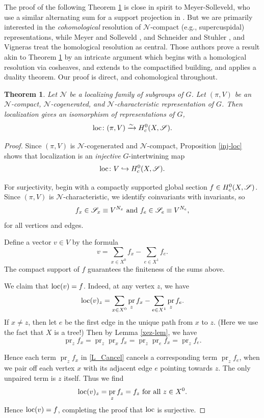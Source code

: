 \documentclass[letter]{amsart}
\newtheorem{thm}{Theorem}[section]
\theoremstyle{definition}
\theoremstyle{remark}
\numberwithin{thm}{section}
\numberwithin{equation}{section}
\renewcommand{\NN}{{\mathcal N}}
\DeclareMathOperator{\pr}{pr}
\begin{document}
The proof of the following Theorem \ref{localization} is close in spirit to Meyer-Solleveld, who use a similar alternating sum for a support projection in \cite[Theorem 2.12]{MS}.  But we are primarily interested in the {\em cohomological} resolution of $\NN$-compact (e.g., supercuspidal) representations, while Meyer and Solleveld \cite{MS}, and Schneider and Stuhler \cite{SS}, and Vigneras \cite{Vigneras} treat the homological resolution as central.  Those authors prove a result akin to Theorem \ref{localization} by an intricate argument which begins with a homological resolution via cosheaves, and extends to the compactified building, and applies a duality theorem.  Our proof is direct, and cohomological throughout.
\begin{thm}
\label{localization}
Let $\NN$ be a localizing family of subgroups of $G$.  Let $(\pi, V)$ be an $\NN$-compact, $\NN$-cogenerated, and $\NN$-characteristic representation of $G$.  Then localization gives an isomorphism of representations of $G$,
$$\operatorname{loc} \colon (\pi, V) \xrightarrow{\sim} H_c^0(X, {\mathscr{S}}).$$
\end{thm}
\begin{proof}
Since $(\pi, V)$ is $\NN$-cogenerated and $\NN$-compact, Proposition \ref{inj-loc} shows that localization is an {\em injective} $G$-intertwining map
$$\operatorname{loc} \colon V \hookrightarrow H_c^0(X, {\mathscr{S}}).$$

For surjectivity, begin with a compactly supported global section $f \in H_c^0(X, {\mathscr{S}})$.  Since $(\pi, V)$ is $\NN$-characteristic, we identify coinvariants with invariants, so 
$$f_x \in {\mathscr{S}}_x \equiv V^{N_x} \text{ and } f_e \in {\mathscr{S}}_e \equiv V^{N_e},$$ 
for all vertices and edges.

Define a vector $v \in V$ by the formula
$$v = \sum_{x \in X^0} f_x - \sum_{e \in X^1} f_e.$$
The compact support of $f$ guarantees the finiteness of the sums above.

We claim that $\operatorname{loc}(v) = f$.  Indeed, at any vertex $z$, we have
\begin{equation}
\label{L_Cancel}
\loc(v)_z = \sum_{x \in X^0}  \pr_z f_x - \sum_{e \in X^1} \pr_z f_e.
\end{equation}
If $x \neq z$, then let $e$ be the first edge in the unique path from $x$ to $z$.  (Here we use the fact that $X$ is a tree!)  Then by Lemma \ref{xez-lem}, we have
\begin{equation}
\label{proj_xz}
\pr_z f_x = \pr_z \pr_x f_x = \pr_z \pr_e f_x = \pr_z f_e.
\end{equation}

Hence each term $\pr_z f_x$ in \eqref{L_Cancel} cancels a corresponding term $\pr_z f_e$, when we pair off each vertex $x$ with its adjacent edge $e$ pointing towards $z$.  The only unpaired term is $z$ itself.  Thus we find
$$\loc(v)_z = \pr_z f_z = f_z \text{ for all } z \in X^0.$$
Hence $\operatorname{loc}(v) = f$, completing the proof that $\operatorname{loc}$ is surjective.   
\end{proof}
\end{document}
